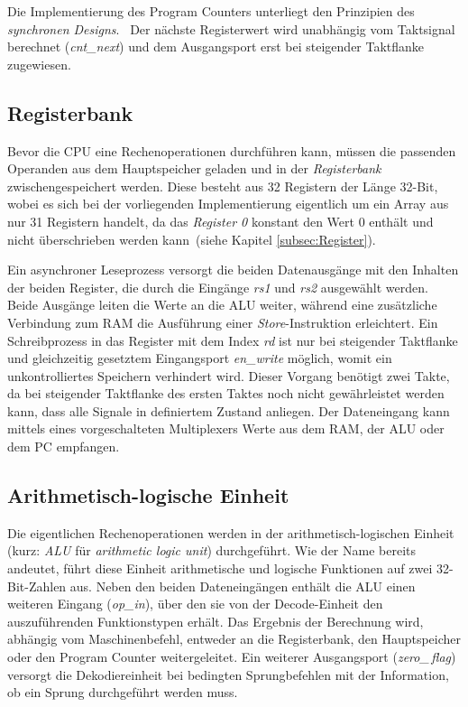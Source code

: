 Die Implementierung des Program Counters unterliegt den Prinzipien des \textit{synchronen Designs}.~\cite[S. 72 ff.]{Chu}
Der nächste Registerwert wird unabhängig vom Taktsignal berechnet (\textit{cnt\_next}) und dem Ausgangsport erst bei steigender Taktflanke zugewiesen. 

\subsection{Registerbank}

Bevor die CPU eine Rechenoperationen durchführen kann, müssen die passenden Operanden aus dem Hauptspeicher geladen und in der \textit{Registerbank} zwischengespeichert werden.
Diese besteht aus 32 Registern der Länge 32-Bit, wobei es sich bei der vorliegenden Implementierung eigentlich um ein Array aus nur 31 Registern handelt, da das \textit{Register 0} konstant den Wert $0$ enthält und nicht überschrieben werden kann~(siehe Kapitel \ref{subsec:Register}).

Ein asynchroner Leseprozess versorgt die beiden Datenausgänge mit den Inhalten der beiden Register, die durch die Eingänge \textit{rs1} und \textit{rs2} ausgewählt werden.
Beide Ausgänge leiten die Werte an die ALU weiter, während eine zusätzliche Verbindung zum RAM die Ausführung einer \textit{Store}-Instruktion erleichtert.
Ein Schreibprozess in das Register mit dem Index \textit{rd} ist nur bei steigender Taktflanke und gleichzeitig gesetztem Eingangsport \textit{en\_write} möglich, womit ein unkontrolliertes Speichern verhindert wird.
Dieser Vorgang benötigt zwei Takte, da bei steigender Taktflanke des ersten Taktes noch nicht gewährleistet werden kann, dass alle Signale in definiertem Zustand anliegen.
Der Dateneingang kann mittels eines vorgeschalteten Multiplexers Werte aus dem RAM, der ALU oder dem PC empfangen.



\subsection{Arithmetisch-logische Einheit}

Die eigentlichen Rechenoperationen werden in der arithmetisch-logischen Einheit (kurz: \textit{ALU} für \textit{arithmetic logic unit}) durchgeführt.
Wie der Name bereits andeutet, führt diese Einheit arithmetische und logische Funktionen auf zwei 32-Bit-Zahlen aus.
Neben den beiden Dateneingängen enthält die ALU einen weiteren Eingang (\textit{op\_in}), über den sie von der Decode-Einheit den auszuführenden Funktionstypen erhält.
Das Ergebnis der Berechnung wird, abhängig vom Maschinenbefehl, entweder an die Registerbank, den Hauptspeicher oder den Program Counter weitergeleitet.
Ein weiterer Ausgangsport (\textit{zero\_\,flag}) versorgt die Dekodiereinheit bei bedingten Sprungbefehlen mit der Information, ob ein Sprung durchgeführt werden muss. 

